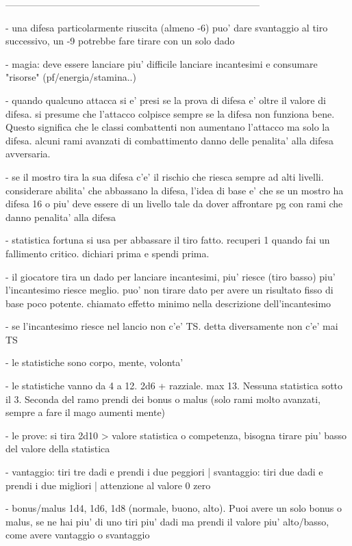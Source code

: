 \documentclass[12pt,a4paper,twoside,openany,twocolumn]{book}
\begin{document}
--------------------------------------------------------------------------------



- una difesa particolarmente riuscita (almeno -6) puo' dare svantaggio al tiro successivo, un -9 potrebbe fare tirare con un solo dado

- magia: deve essere lanciare piu' difficile lanciare incantesimi e consumare "risorse" (pf/energia/stamina..)

- quando qualcuno attacca si e' presi se la prova di difesa e' oltre il valore di difesa. si presume che l'attacco colpisce sempre se la difesa non funziona bene. Questo significa che le classi combattenti non aumentano l'attacco ma solo la difesa. alcuni rami avanzati di combattimento danno delle penalita' alla difesa avversaria.

- se il mostro tira la sua difesa c'e' il rischio che riesca sempre ad alti livelli. considerare abilita' che abbassano la difesa, l'idea di base e' che se un mostro ha difesa 16 o piu' deve essere di un livello tale da dover affrontare pg con rami che danno penalita' alla difesa

- statistica fortuna si usa per abbassare il tiro fatto. recuperi 1 quando fai un fallimento critico. dichiari prima e spendi prima.

- il giocatore tira un dado per lanciare incantesimi, piu' riesce (tiro basso) piu' l'incantesimo riesce meglio. puo' non tirare dato per avere un risultato fisso di base poco potente. chiamato effetto minimo nella descrizione dell'incantesimo

- se l'incantesimo riesce nel lancio non c'e' TS. detta diversamente non c'e' mai TS

- le statistiche sono corpo, mente, volonta'

- le statistiche vanno da 4 a 12. 2d6 + razziale. max 13. Nessuna statistica sotto il 3. Seconda del ramo prendi dei bonus o malus (solo rami molto avanzati, sempre a fare il mago aumenti mente)

- le prove: si tira 2d10 > valore statistica o competenza,  bisogna tirare piu' basso del valore della statistica

- vantaggio: tiri tre dadi e prendi i due peggiori  |  svantaggio: tiri due dadi e prendi i due migliori | attenzione al valore 0 zero

- bonus/malus 1d4, 1d6, 1d8 (normale, buono, alto). Puoi avere un solo bonus o malus, se ne hai piu' di uno tiri piu' dadi ma prendi il valore piu' alto/basso, come avere vantaggio o svantaggio
\end{document}
